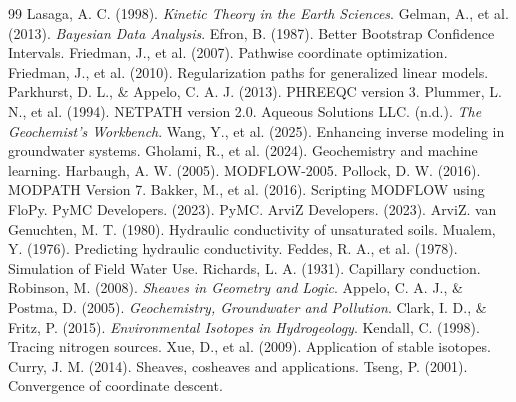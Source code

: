\documentclass[12pt,a4paper]{article}
\theoremstyle{plain}
\theoremstyle{definition}
\theoremstyle{remark}
\begin{document}
\begin{thebibliography}{99}
	 Lasaga, A. C. (1998). \textit{Kinetic Theory in the Earth Sciences}.
	 Gelman, A., et al. (2013). \textit{Bayesian Data Analysis}.
	 Efron, B. (1987). Better Bootstrap Confidence Intervals.
	 Friedman, J., et al. (2007). Pathwise coordinate optimization.
	 Friedman, J., et al. (2010). Regularization paths for generalized linear models.
	 Parkhurst, D. L., \& Appelo, C. A. J. (2013). PHREEQC version 3.
	 Plummer, L. N., et al. (1994). NETPATH version 2.0.
	 Aqueous Solutions LLC. (n.d.). \textit{The Geochemist's Workbench}.
	 Wang, Y., et al. (2025). Enhancing inverse modeling in groundwater systems.
	 Gholami, R., et al. (2024). Geochemistry and machine learning.
	 Harbaugh, A. W. (2005). MODFLOW-2005.
	 Pollock, D. W. (2016). MODPATH Version 7.
	 Bakker, M., et al. (2016). Scripting MODFLOW using FloPy.
	 PyMC Developers. (2023). PyMC.
	 ArviZ Developers. (2023). ArviZ.
	 van Genuchten, M. T. (1980). Hydraulic conductivity of unsaturated soils.
	 Mualem, Y. (1976). Predicting hydraulic conductivity.
	 Feddes, R. A., et al. (1978). Simulation of Field Water Use.
	 Richards, L. A. (1931). Capillary conduction.
	 Robinson, M. (2008). \textit{Sheaves in Geometry and Logic}.
	 Appelo, C. A. J., \& Postma, D. (2005). \textit{Geochemistry, Groundwater and Pollution}.
	 Clark, I. D., \& Fritz, P. (2015). \textit{Environmental Isotopes in Hydrogeology}.
	 Kendall, C. (1998). Tracing nitrogen sources.
	 Xue, D., et al. (2009). Application of stable isotopes.
	 Curry, J. M. (2014). Sheaves, cosheaves and applications.
	 Tseng, P. (2001). Convergence of coordinate descent.
\end{thebibliography}
\end{document}
